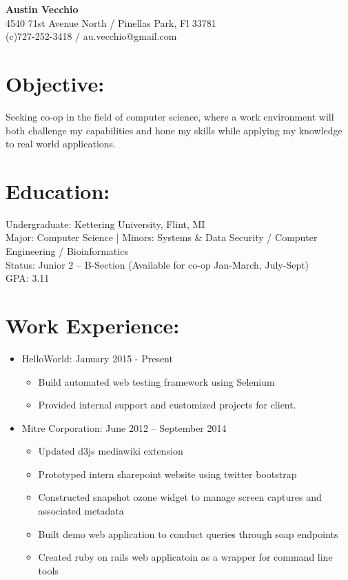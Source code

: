 \documentclass{res}
\begin{document}
\begin{center}
\LARGE{\textbf{Austin Vecchio}}\\
\normalsize{
4540 71st Avenue North / Pinellas Park, Fl 33781\\
(c)727-252-3418 / au.vecchio@gmail.com
}
\end{center}

\section{Objective:}
Seeking co-op in the field of computer science, where a work environment will both challenge my capabilities and hone my skills while applying my knowledge to real world applications.\\

\section{Education:}

Undergraduate: Kettering University, Flint, MI\\
Major: Computer Science
|   Minors: Systems \& Data Security / Computer Engineering / Bioinformatics\\
Status: Junior 2 – B-Section (Available for co-op Jan-March, July-Sept)\\
GPA: 3.11

\section{Work Experience:}
\begin{itemize}
\item HelloWorld: \hspace{45pt} January 2015 - Present
\begin{itemize}[label=$\circ$]
\item Build automated web testing framework using Selenium
\item Provided internal support and customized projects for client.
\end{itemize}
\item Mitre Corporation: \hspace{45pt} June 2012 – September 2014
\begin{itemize}[label=$\circ$]
\item Updated d3js mediawiki extension
\item Prototyped intern sharepoint website using twitter bootstrap
\item Constructed snapshot ozone widget to manage screen captures and associated metadata
\item Built demo web application to conduct queries through soap endpoints
\item Created ruby on rails web applicatoin as a wrapper for command line tools
\end{itemize}
\end{itemize}
\end{document}
